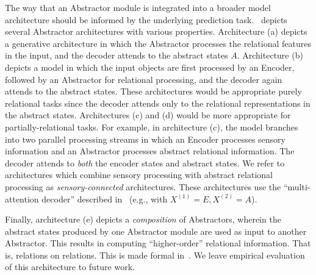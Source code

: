 The way that an Abstractor module is integrated into a broader model architecture should be informed by the underlying prediction task.~ depicts several Abstractor architectures with various properties. Architecture (a) depicts a generative architecture in which the Abstractor processes the relational features in the input, and the decoder attends to the abstract states $A$. Architecture (b) depicts a model in which the input objects are first processed by an Encoder, followed by an Abstractor for relational processing, and the decoder again attends to the abstract states. These architectures would be appropriate purely relational tasks since the decoder attends only to the relational representations in the abstract states. Architectures (c) and (d) would be more appropriate for partially-relational tasks. For example, in architecture (c), the model branches into two parallel processing streams in which an Encoder processes sensory information and an Abstractor processes abstract relational information. The decoder attends to \textit{both} the encoder states and abstract states. We refer to architectures which combine sensory processing with abstract relational processing as \textit{sensory-connected} architectures. These architectures use the ``multi-attention decoder'' described in~ (e.g., with $X^{(1)} = E, X^{(2)} = A$).

Finally, architecture (e) depicts a \textit{composition} of Abstractors, wherein the abstract states produced by one Abstractor module are used as input to another Abstractor. This results in computing ``higher-order'' relational information. That is, relations on relations. This is made formal in~. We leave empirical evaluation of this architecture to future work.